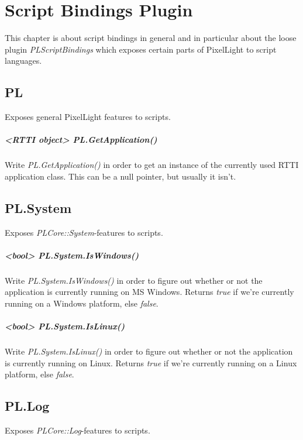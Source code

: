 \chapter{Script Bindings Plugin}
\label{ScriptBindingsPlugin}
This chapter is about script bindings in general and in particular about the loose plugin \emph{PLScriptBindings} which exposes certain parts of PixelLight to script languages.




\section{PL}
Exposes general PixelLight features to scripts.

\paragraph{<RTTI object> PL.GetApplication()}
Write \emph{PL.GetApplication()} in order to get an instance of the currently used RTTI application class. This can be a null pointer, but usually it isn't.




\section{PL.System}
Exposes \emph{PLCore::System}-features to scripts.

\paragraph{<bool> PL.System.IsWindows()}
Write \emph{PL.System.IsWindows()} in order to figure out whether or not the application is currently running on MS Windows. Returns \emph{true} if we're currently running on a Windows platform, else \emph{false}.

\paragraph{<bool> PL.System.IsLinux()}
Write \emph{PL.System.IsLinux()} in order to figure out whether or not the application is currently running on Linux. Returns \emph{true} if we're currently running on a Linux platform, else \emph{false}.




\section{PL.Log}
Exposes \emph{PLCore::Log}-features to scripts.

